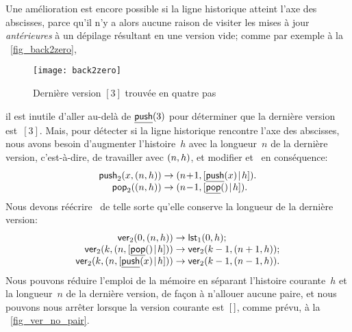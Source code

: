 Une amélioration est encore possible si la ligne historique atteint
l'axe des abscisses, parce qu'il n'y a alors aucune raison de visiter
les mises à jour \emph{antérieures} à un dépilage résultant en une
version vide; comme par exemple à la \fig~\vref{fig_back2zero},
\begin{figure}
\centering
\texttt{[image: back2zero]}
\caption{Dernière version $[3]$ trouvée en quatre pas\label{fig_back2zero}}
\end{figure}
il est inutile d'aller au-delà de
\(\underline{\textsf{push}}(3)\) pour déterminer que la
dernière version est~\([3]\). Mais, pour détecter si la ligne
historique rencontre l'axe des abscisses, nous avons besoin
d'augmenter l'histoire~\(h\) avec la longueur~\(n\) de la dernière
version, c'est-à-dire, de travailler avec \(({n},{h})\), et modifier
et~ en conséquence:
\begin{equation*}
\begin{array}{@{}r@{\;}l@{\;}l@{}}
\fun{push}_2(x,\pair{n}{h}) & \rightarrow &
\pair{n\!+\!1}{\cons{\ufun{push}(x)}{h}}.\\
\fun{pop}_2(\pair{n}{h}) & \rightarrow &
\pair{n\!-\!1}{\cons{\ufun{pop}()}{h}}.
\end{array}
\end{equation*}
Nous devons réécrire~ de
telle sorte qu'elle conserve la longueur de la dernière version:
\begin{equation*}
\begin{array}{@{}r@{\;}l@{\;}l@{}}
\fun{ver}_2(0,\pair{n}{h}) & \rightarrow & \fun{lst}_1(0,h);\\
\fun{ver}_2(k,\pair{n}{\cons{\ufun{pop}()}{h}})
                      & \rightarrow & \fun{ver}_2(k-1,\pair{n+1}{h});\\
\fun{ver}_2(k,\pair{n}{\cons{\ufun{push}(x)}{h}})
                      & \rightarrow & \fun{ver}_2(k-1,\pair{n-1}{h}).
\end{array}
\end{equation*}
Nous pouvons réduire l'emploi de la mémoire en
séparant l'histoire courante~\(h\) et la longueur~\(n\) de la dernière
version, de façon à n'allouer aucune paire, et nous pouvons nous
arrêter lorsque la version courante est~\([\,]\), comme prévu, à la
\fig~\vref{fig_ver_no_pair}.

